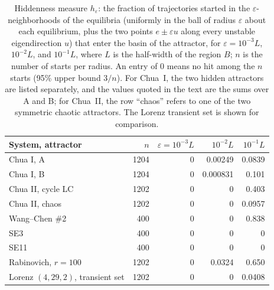 \begin{table}[tbhp]
\centering
\caption{Hiddenness measure $h_\varepsilon$: the fraction of trajectories started in the $\varepsilon$-neighborhoods of the equilibria (uniformly in the ball of radius $\varepsilon$ about each equilibrium, plus the two points $e\pm\varepsilon u$ along every unstable eigendirection $u$) that enter the basin of the attractor, for $\varepsilon=10^{-3}L$, $10^{-2}L$, and $10^{-1}L$, where $L$ is the half-width of the region $B$; $n$ is the number of starts per radius. An entry of 0 means no hit among the $n$ starts (95\% upper bound $3/n$). For Chua~I, the two hidden attractors are listed separately, and the values quoted in the text are the sums over A and B; for Chua~II, the row ``chaos'' refers to one of the two symmetric chaotic attractors. The Lorenz transient set is shown for comparison.}
\label{tab:hidden}
\scriptsize

\begin{tabular}{lrrrr}
\toprule
System, attractor & $n$ & $\varepsilon=10^{-3}L$ & $10^{-2}L$ & $10^{-1}L$ \\
\midrule
Chua I, A & 1204 & 0 & 0.00249 & 0.0839 \\
Chua I, B & 1204 & 0 & 0.000831 & 0.101 \\
Chua II, cycle LC & 1202 & 0 & 0 & 0.403 \\
Chua II, chaos & 1202 & 0 & 0 & 0.0957 \\
Wang--Chen \#2 & 400 & 0 & 0 & 0.838 \\
SE3 & 400 & 0 & 0 & 0 \\
SE11 & 400 & 0 & 0 & 0 \\
Rabinovich, $r=100$ & 1202 & 0 & 0.0324 & 0.650 \\
Lorenz $(4,29,2)$, transient set & 1202 & 0 & 0 & 0.0408 \\
\bottomrule
\end{tabular}

\end{table}
